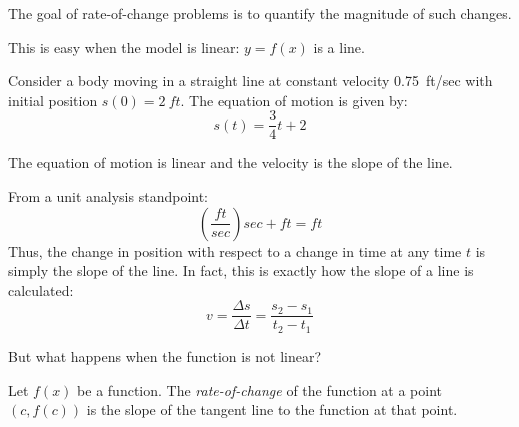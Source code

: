 \documentclass[letterpaper,12pt,fleqn]{article}
\begin{document}
The goal of rate-of-change problems is to quantify the magnitude of such changes.

This is easy when the model is linear: \(y=f(x)\) is a line.

\begin{example}
  Consider a body moving in a straight line at constant velocity \SI{0.75}{ft/sec} with initial position
  \(s(0)=\SI{2}{ft}\).  The equation of motion is given by:
  \[s(t)=\frac{3}{4}t+2\]
  \begin{center}
  \end{center}

  \bigskip

  The equation of motion is linear and the velocity is the slope of the line.

  From a unit analysis standpoint:
  \[\left(\frac{\si{ft}}{\si{sec}}\right)\si{sec}+\si{ft}=\si{ft}\]
  Thus, the change in position with respect to a change in time at any time \(t\) is simply the slope of the line.
  In fact, this is exactly how the slope of a line is calculated:
  \[v=\frac{\Delta s}{\Delta t}=\frac{s_2-s_1}{t_2-t_1}\]
\end{example}

But what happens when the function is not linear?

\begin{definition}
  Let \(f(x)\) be a function.  The \emph{rate-of-change} of the function at a point \((c,f(c))\) is the slope of
  the tangent line to the function at that point.
\end{definition}

\begin{center}
\end{center}
\end{document}
